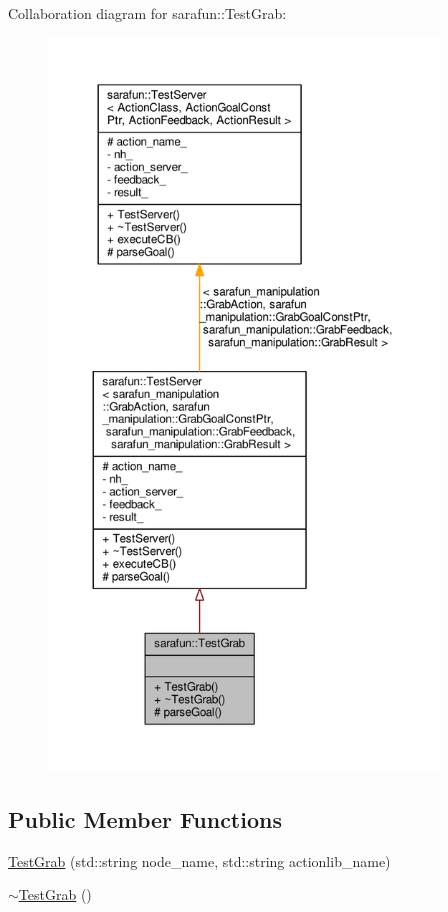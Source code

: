 Collaboration diagram for sarafun\-:\-:Test\-Grab\-:
\nopagebreak
\begin{figure}[H]
\begin{center}
\leavevmode
\includegraphics[height=550pt]{d9/deb/classsarafun_1_1TestGrab__coll__graph}
\end{center}
\end{figure}
\subsection*{Public Member Functions}
\begin{DoxyCompactItemize}
\item 
\hyperlink{classsarafun_1_1TestGrab_a3f9ee23df0bde4b2e8e48d1bc6f942b7_a3f9ee23df0bde4b2e8e48d1bc6f942b7}{Test\-Grab} (std\-::string node\-\_\-name, std\-::string actionlib\-\_\-name)
\item 
\hyperlink{classsarafun_1_1TestGrab_a68d490aee932b31716030f11ad969fdf_a68d490aee932b31716030f11ad969fdf}{$\sim$\-Test\-Grab} ()
\end{DoxyCompactItemize}
